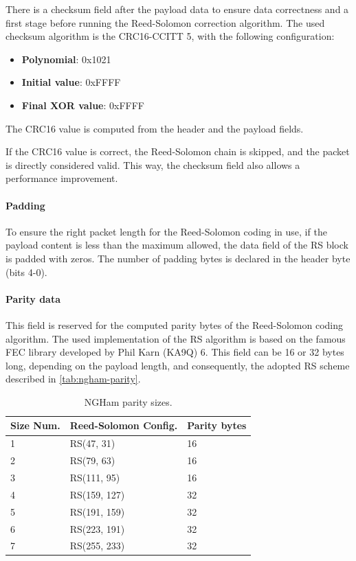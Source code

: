 There is a checksum field after the payload data to ensure data correctness and a first stage before running the Reed-Solomon correction algorithm. The used checksum algorithm is the CRC16-CCITT 5, with the following configuration:

\begin{itemize}
    \item \textbf{Polynomial}: 0x1021
    \item \textbf{Initial value}: 0xFFFF
    \item \textbf{Final XOR value}: 0xFFFF
\end{itemize}

The CRC16 value is computed from the header and the payload fields.

If the CRC16 value is correct, the Reed-Solomon chain is skipped, and the packet is directly considered valid. This way, the checksum field also allows a performance improvement.

\paragraph{Padding}

To ensure the right packet length for the Reed-Solomon coding in use, if the payload content is less than the maximum allowed, the data field of the RS block is padded with zeros. The number of padding bytes is declared in the header byte (bits 4-0).

\paragraph{Parity data}

This field is reserved for the computed parity bytes of the Reed-Solomon coding algorithm. The used implementation of the RS algorithm is based on the famous FEC library developed by Phil Karn (KA9Q) 6. This field can be 16 or 32 bytes long, depending on the payload length, and consequently, the adopted RS scheme described in \autoref{tab:ngham-parity}.

\begin{table}[!ht]
    \centering
    \begin{tabular}{lll}
        \toprule[1.5pt]
        \textbf{Size Num.} & \textbf{Reed-Solomon Config.} & \textbf{Parity bytes} \\
        \midrule
        1 & RS(47, 31)   & 16 \\
        2 & RS(79, 63)   & 16 \\
        3 & RS(111, 95)  & 16 \\
        4 & RS(159, 127) & 32 \\
        5 & RS(191, 159) & 32 \\
        6 & RS(223, 191) & 32 \\
        7 & RS(255, 233) & 32 \\
        \bottomrule[1.5pt]
    \end{tabular}
    \caption{NGHam parity sizes.}
    \label{tab:ngham-parity}
\end{table}

